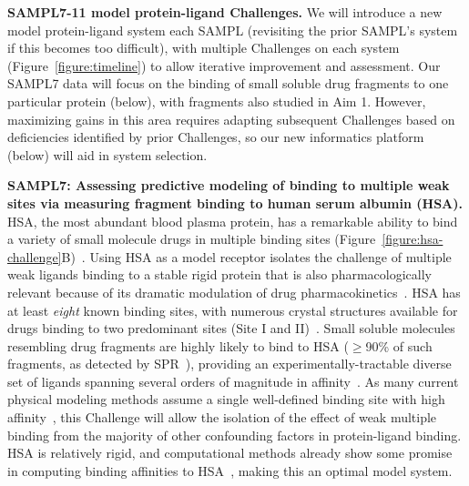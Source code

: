 \documentclass[11pt]{article}
\begin{document}
\textbf{SAMPL7-11 model protein-ligand Challenges.} 
We will introduce a new model protein-ligand system each SAMPL (revisiting the prior SAMPL's system if this becomes too difficult), with multiple Challenges on each system (Figure~\ref{figure:timeline}) to allow iterative improvement and assessment.
Our SAMPL7 data will focus on the binding of small soluble drug fragments to one particular protein (below), with fragments also studied in Aim 1. 
However, maximizing gains in this area requires adapting subsequent Challenges based on deficiencies identified by prior Challenges, so our new informatics platform (below) will aid in system selection.

\textbf{SAMPL7: Assessing predictive modeling of binding to multiple weak sites via measuring fragment binding to human serum albumin (HSA).}
HSA, the most abundant blood plasma protein, has a remarkable ability to bind a variety of small molecule drugs in multiple binding sites (Figure~\ref{figure:hsa-challenge}B)~\cite{Fasano:2005:IUBMBLife(InternationalUnionofBiochemistryandMolecularBiology:Life)}.
Using HSA as a model receptor isolates the challenge of multiple weak ligands binding to a stable rigid protein that is also pharmacologically relevant because of its dramatic modulation of drug pharmacokinetics~\cite{Hall:2013:JournalofChemicalInformationandModeling}.
HSA has at least \emph{eight} known binding sites, with numerous crystal structures available for drugs binding to two predominant sites (Site I and II)~\cite{Hall:2013:JournalofChemicalInformationandModeling}.
Small soluble molecules resembling drug fragments are highly likely to bind to HSA ($\ge$90\% of such fragments, as detected by SPR~\cite{Elinder:2011:JournalofBiomolecularScreening}), providing an experimentally-tractable diverse set of ligands spanning several orders of magnitude in affinity~\cite{Elinder:2011:JournalofBiomolecularScreening}.
As many current physical modeling methods assume a single well-defined binding site with high affinity~\cite{Gilson:1997:BiophysicalJournal}, this Challenge will allow the isolation of the effect of weak multiple binding from the majority of other confounding factors in protein-ligand binding.
HSA is relatively rigid, and computational methods already show some promise in computing binding affinities to HSA~\cite{Hall:2013:JournalofChemicalInformationandModeling,Lexa:2014:PLoSONE,Evoli:2016:Phys.Chem.Chem.Phys.}, making this an optimal model system.
\end{document}
